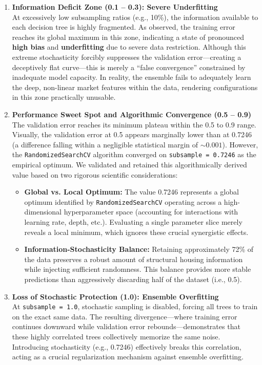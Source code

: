 \documentclass[11pt]{article}
\begin{document}
\begin{enumerate}[label=\textbf{\arabic*.}, leftmargin=*, itemsep=0.4cm]
\item  \textbf{Information Deficit Zone (0.1 -- 0.3): Severe Underfitting} \\
At excessively low subsampling ratios (e.g., 10\%), the information available to each decision tree is highly fragmented. As observed, the training error reaches its global maximum in this zone, indicating a state of pronounced \textbf{high bias} and \textbf{underfitting} due to severe data restriction. Although this extreme stochasticity forcibly suppresses the validation error---creating a deceptively flat curve---this is merely a ``false convergence'' constrained by inadequate model capacity. In reality, the ensemble fails to adequately learn the deep, non-linear market features within the data, rendering configurations in this zone practically unusable.
\item  \textbf{Performance Sweet Spot and Algorithmic Convergence (0.5 -- 0.9)} \\
The validation error reaches its minimum plateau within the 0.5 to 0.9 range. Visually, the validation error at 0.5 appears marginally lower than at 0.7246 (a difference falling within a negligible statistical margin of $\sim 0.001$). However, the \texttt{RandomizedSearchCV} algorithm converged on \texttt{subsample = 0.7246} as the empirical optimum. We validated and retained this algorithmically derived value based on two rigorous scientific considerations:
\begin{itemize}
    \item \textbf{Global vs. Local Optimum:} The value 0.7246 represents a global optimum identified by \texttt{RandomizedSearchCV} operating across a high-dimensional hyperparameter space (accounting for interactions with learning rate, depth, etc.). Evaluating a single parameter slice merely reveals a local minimum, which ignores these crucial synergistic effects.
    \item \textbf{Information-Stochasticity Balance:} Retaining approximately 72\% of the data preserves a robust amount of structural housing information while injecting sufficient randomness. This balance provides more stable predictions than aggressively discarding half of the dataset (i.e., 0.5).
\end{itemize}
\item  \textbf{Loss of Stochastic Protection (1.0): Ensemble Overfitting} \\
At \texttt{subsample = 1.0}, stochastic sampling is disabled, forcing all trees to train on the exact same data. The resulting divergence---where training error continues downward while validation error rebounds---demonstrates that these highly correlated trees collectively memorize the same noise. Introducing stochasticity (e.g., 0.7246) effectively breaks this correlation, acting as a crucial regularization mechanism against ensemble overfitting.
\end{enumerate}
\end{document}

